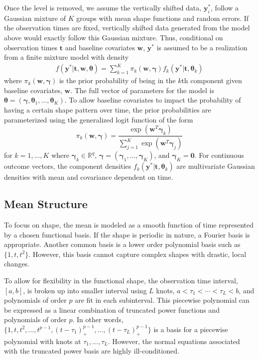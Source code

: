\documentclass[12pt]{article}
\newcommand{\B}[0]{\mathbf}
\newcommand{\BS}[0]{\boldsymbol}
\begin{document}
Once the level is removed, we assume the vertically shifted data, $\B y_{i}^{*}$, follow a Gaussian mixture of $K$ groups with mean shape functions and random errors. If the observation times are fixed, vertically shifted data generated from the model above would exactly follow this Gaussian mixture. Thus, conditional on observation times $\B t$ and baseline covariates $\B w$, $\B y^{*}$ is assumed to be a realization from a finite mixture model with density
\begin{align*}
 f(\B y^{*}|\B t,\B w,\BS\theta) =  \sum^{K}_{k=1}\pi_{k}(\B w,\BS \gamma)f_{k}( \B y^{*}|\B t,\BS\theta_{k})
\end{align*}
where $\pi_{k}(\B w,\BS \gamma)$ is the prior probability of being in the $k$th component given baseline covariates, $\B w$. The full vector of parameters for the model is $\BS\theta = (\BS\gamma,\BS\theta_{1},...,\BS\theta_{K})$. To allow baseline covariates to impact the probability of having a certain shape pattern over time, the prior probabilities are parameterized using the generalized logit function of the form
$$\pi_{k}(\B w,\BS\gamma)=\frac{\exp(\B w^{T}\BS\gamma_{k})}{\sum_{j=1}^{K}\exp(\B w^{T}\BS\gamma_{j})}$$ 
for $k=1,...,K$ where $\BS \gamma_{k}\in\mathbb{R}^{q}$, $\BS\gamma = (\BS\gamma_{1},...,\BS\gamma_{K})$, and $\BS\gamma_{K}=\B 0$. For continuous outcome vectors, the component densities $f_{k}(\B y^{*}|\B t,\BS\theta_{k})$ are multivariate Gaussian densities with mean and covariance dependent  on time.

\subsection{Mean Structure}
To focus on shape, the mean is modeled as a smooth function of time represented by a chosen functional basis. If the shape is periodic in nature, a Fourier basis is appropriate. Another common basis is a lower order polynomial basis such as $\{1, t, t^{2}\}$. However, this basis cannot capture complex shapes with drastic, local changes. 

To allow for flexibility in the functional shape, the observation time interval, $[a,b]$, is broken up into smaller interval using $L$ knots, $a<\tau_{1}<\cdots<\tau_{L}<b$, and polynomials of order $p$ are fit in each subinterval. This piecewise polynomial can be expressed as a linear combination of truncated power functions and polynomials of order $p$. In other words,
$\{1,t,t^{2},...,t^{p-1},(t-\tau_{1})_{+}^{p-1},...,(t-\tau_{L})_{+}^{p-1}\}$
is a basis for a piecewise polynomial with knots at $\tau_{1},...,\tau_{L}$. However, the normal equations associated with the truncated power basis are highly ill-conditioned. 
\end{document}
